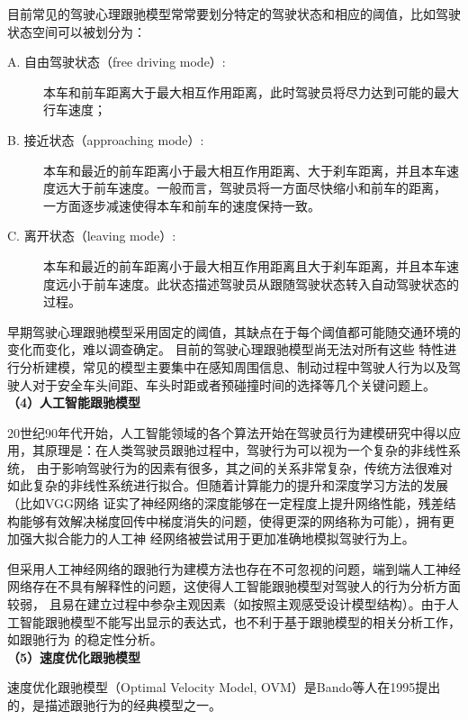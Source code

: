 目前常见的驾驶心理跟驰模型常常要划分特定的驾驶状态和相应的阈值，比如驾驶状态空间可以被划分为：\\

\begin{description}
\item [A. 自由驾驶状态（free driving mode）:]
  本车和前车距离大于最大相互作用距离，此时驾驶员将尽力达到可能的最大行车速度； \\
\item [B. 接近状态（approaching mode）:]
  本车和最近的前车距离小于最大相互作用距离、大于刹车距离，并且本车速度远大于前车速度。一般而言，驾驶员将一方面尽快缩小和前车的距离，
  一方面逐步减速使得本车和前车的速度保持一致。 \\
\item [C. 离开状态（leaving mode）:]
  本车和最近的前车距离小于最大相互作用距离且大于刹车距离，并且本车速度远小于前车速度。此状态描述驾驶员从跟随驾驶状态转入自动驾驶状态的过程。
\end{description}  

早期驾驶心理跟驰模型采用固定的阈值，其缺点在于每个阈值都可能随交通环境的变化而变化，难以调查确定。 目前的驾驶心理跟驰模型尚无法对所有这些
特性进行分析建模，常见的模型主要集中在感知周围信息、制动过程中驾驶人行为以及驾驶人对于安全车头间距、车头时距或者预碰撞时间的选择等几个关键问题上。\\

\noindent \textbf{（4）人工智能跟驰模型}

20世纪90年代开始，人工智能领域的各个算法开始在驾驶员行为建模研究中得以应用，其原理是：在人类驾驶员跟驰过程中，驾驶行为可以视为一个复杂的非线性系统，
由于影响驾驶行为的因素有很多，其之间的关系非常复杂，传统方法很难对如此复杂的非线性系统进行拟合。但随着计算能力的提升和深度学习方法的发展（比如VGG网络
证实了神经网络的深度能够在一定程度上提升网络性能，残差结构能够有效解决梯度回传中梯度消失的问题，使得更深的网络称为可能），拥有更加强大拟合能力的人工神
经网络被尝试用于更加准确地模拟驾驶行为上。\cite{Kikuchi1992fuzzy}

但采用人工神经网络的跟驰行为建模方法也存在不可忽视的问题，端到端人工神经网络存在不具有解释性的问题，这使得人工智能跟驰模型对驾驶人的行为分析方面较弱，
且易在建立过程中参杂主观因素（如按照主观感受设计模型结构）。由于人工智能跟驰模型不能写出显示的表达式，也不利于基于跟驰模型的相关分析工作，如跟驰行为
的稳定性分析。 \\ 

\noindent \textbf{（5）速度优化跟驰模型}

速度优化跟驰模型（Optimal Velocity Model, OVM）是Bando等人在1995提出的，是描述跟驰行为的经典模型之一。\cite{PhysRevE.51.1035}

